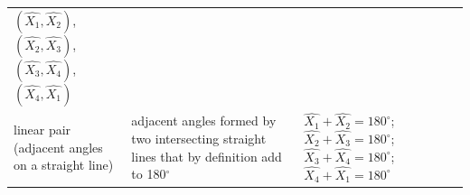 {{\begin{center}
\begin{xtabular}[t]{|l|l|l|}
        \begin{math}\left(\hat{{X}_{1}},\hat{{X}_{2}}\right)\end{math}, \begin{math}\left(\hat{{X}_{2}},\hat{{X}_{3}}\right)\end{math}, \begin{math}\left(\hat{{X}_{3}},\hat{{X}_{4}}\right)\end{math}, \begin{math}\left(\hat{{X}_{4}},\hat{{X}_{1}}\right)\end{math}%
     \tabularnewline{}
    
    
        linear pair (adjacent angles on a straight line) &
    
    
        adjacent angles formed by two intersecting straight lines that by definition add to 180\begin{math}{}^{\circ }\end{math} &
    
    
        
                  \begin{math}\hat{{X}_{1}}+\hat{{X}_{2}}={180}^{\circ }\end{math};
                  \begin{math}\hat{{X}_{2}}+\hat{{X}_{3}}={180}^{\circ }\end{math};
                  \begin{math}\hat{{X}_{3}}+\hat{{X}_{4}}={180}^{\circ }\end{math};
                  \begin{math}\hat{{X}_{4}}+\hat{{X}_{1}}={180}^{\circ }\end{math}
     \tabularnewline{}
    

\end{xtabular}
\end{center}}}
